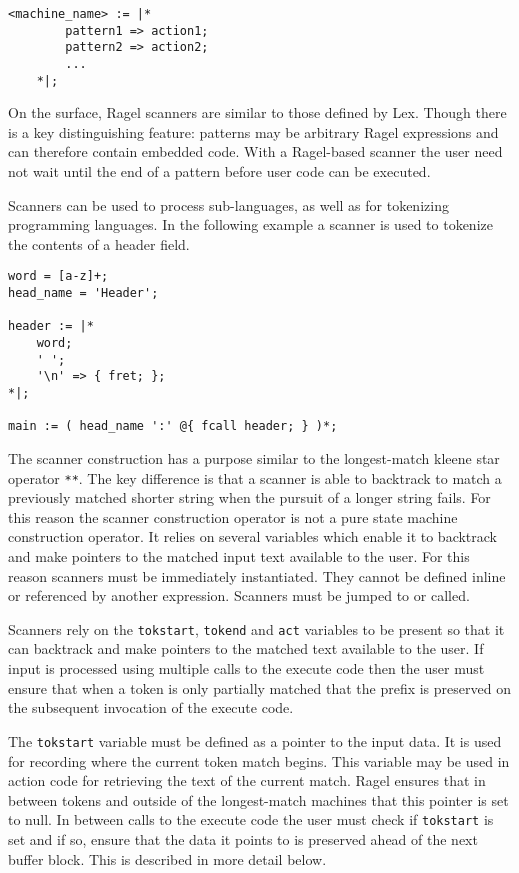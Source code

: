 \documentclass[letterpaper,11pt,oneside]{book}
\newcommand{\verbspace}{\vspace{10pt}}
\newenvironment{inline_code}{\def\baselinestretch{1}\vspace{12pt}\small}{}
\begin{document}
\verbspace
\begin{verbatim}
<machine_name> := |* 
        pattern1 => action1;
        pattern2 => action2;
        ...
    *|;
\end{verbatim}
\verbspace

On the surface, Ragel scanners are similar to those defined by Lex. Though
there is a key distinguishing feature: patterns may be arbitrary Ragel
expressions and can therefore contain embedded code. With a Ragel-based scanner
the user need not wait until the end of a pattern before user code can be
executed.

Scanners can be used to process sub-languages, as well as for tokenizing
programming languages. In the following example a scanner is used to tokenize
the contents of a header field.

\begin{inline_code}
\begin{verbatim}
word = [a-z]+;
head_name = 'Header';

header := |*
    word;
    ' ';
    '\n' => { fret; };
*|;

main := ( head_name ':' @{ fcall header; } )*;
\end{verbatim}
\end{inline_code}
\verbspace

The scanner construction has a purpose similar to the longest-match kleene star
operator \verb|**|. The key
difference is that a scanner is able to backtrack to match a previously matched
shorter string when the pursuit of a longer string fails.  For this reason the
scanner construction operator is not a pure state machine construction
operator. It relies on several variables which enable it to backtrack and make
pointers to the matched input text available to the user.  For this reason
scanners must be immediately instantiated. They cannot be defined inline or
referenced by another expression. Scanners must be jumped to or called.

Scanners rely on the \verb|tokstart|, \verb|tokend| and \verb|act|
variables to be present so that it can backtrack and make pointers to the
matched text available to the user. If input is processed using multiple calls
to the execute code then the user must ensure that when a token is only
partially matched that the prefix is preserved on the subsequent invocation of
the execute code.

The \verb|tokstart| variable must be defined as a pointer to the input data.
It is used for recording where the current token match begins. This variable
may be used in action code for retrieving the text of the current match.  Ragel
ensures that in between tokens and outside of the longest-match machines that
this pointer is set to null. In between calls to the execute code the user must
check if \verb|tokstart| is set and if so, ensure that the data it points to is
preserved ahead of the next buffer block. This is described in more detail
below.
\end{document}
